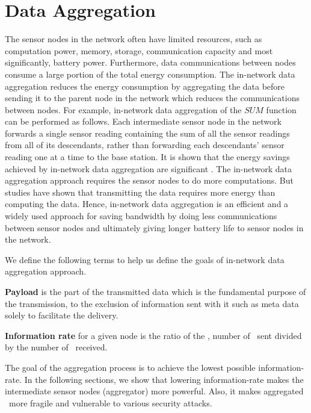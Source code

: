 \section{Data Aggregation}
	The sensor nodes in the network often have limited resources, such as computation power, memory, storage, communication capacity and most significantly, battery power.
	Furthermore, data communications between nodes consume a large portion of the total energy consumption. 
	The in-network data aggregation reduces the energy consumption by aggregating the data before sending it to the parent node in the network which reduces the communications between nodes.
	For example, in-network data aggregation of the $\textit{SUM}$ function can be performed as follows. 
	Each intermediate sensor node in the network forwards a single sensor reading containing the sum of all the sensor readings from all of its descendants, rather than forwarding each descendants' sensor reading one at a time to the base station.
	It is shown that the energy savings achieved by in-network data aggregation are significant \cite{madden2002tag}.
	The in-network data aggregation approach requires the sensor nodes to do more computations.
	But studies have shown that transmitting the data requires more energy than computing the data. 
	Hence, in-network data aggregation is an efficient and a widely used approach for saving bandwidth by doing less communications between sensor nodes and ultimately giving longer battery life to sensor nodes in the network.

	We define the following terms to help us define the goals of in-network data aggregation approach.
	\begin{definition}\label{def:payload}\cite{PayloadWiKi}
		\textbf{Payload} is the part of the transmitted data which is the fundamental purpose of the transmission, to the exclusion of information sent with it such as meta data solely to facilitate the delivery.
	\end{definition}
	\begin{definition}\label{def:information-rate}
		\textbf{Information rate} for a given node is the ratio of the \payloads, number of \payloads\ sent divided by the number of \payloads\ received.
	\end{definition}
	The goal of the aggregation process is to achieve the lowest possible information-rate.
	In the following sections, we show that lowering information-rate makes the intermediate sensor nodes (aggregator) more powerful.
	Also, it makes aggregated \payload\ more fragile and vulnerable to various security attacks.


